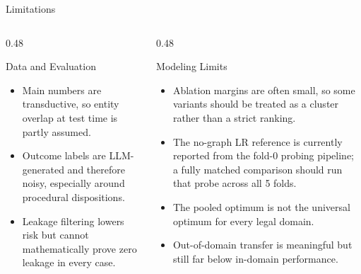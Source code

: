 \documentclass[aspectratio=169,11pt]{beamer}
\newenvironment{tightitemize}{
  \begin{itemize}
    \setlength{\itemsep}{2pt}
    \setlength{\parskip}{0pt}
}{\end{itemize}}
\begin{document}
\begin{frame}{Limitations}
  \scriptsize
  \begin{columns}[T,onlytextwidth]
    \begin{column}{0.48\textwidth}
      \begin{block}{Data and Evaluation}
        \begin{tightitemize}
          \item Main numbers are transductive, so entity overlap at test time is partly assumed.
          \item Outcome labels are LLM-generated and therefore noisy, especially around procedural dispositions.
          \item Leakage filtering lowers risk but cannot mathematically prove zero leakage in every case.
        \end{tightitemize}
      \end{block}
    \end{column}
    \begin{column}{0.48\textwidth}
      \begin{block}{Modeling Limits}
        \begin{tightitemize}
          \item Ablation margins are often small, so some variants should be treated as a cluster rather than a strict ranking.
          \item The no-graph LR reference is currently reported from the fold-0 probing pipeline; a fully matched comparison should run that probe across all 5 folds.
          \item The pooled optimum is not the universal optimum for every legal domain.
          \item Out-of-domain transfer is meaningful but still far below in-domain performance.
        \end{tightitemize}
      \end{block}
    \end{column}
  \end{columns}
\end{frame}
\end{document}

